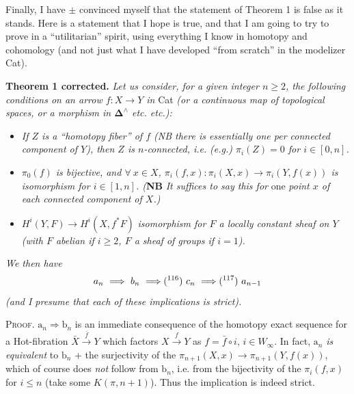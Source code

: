 \documentclass[11pt]{article}
\newcommand{\msp}[1]{\marginpar{\footnotesize [#1]}}
\begin{document}
Finally, I have $\pm$ convinced myself that the statement of Theorem 1 is false as it stands. Here is a statement that I hope is true, and that I am going to try to prove in a ``utilitarian'' spirit, using everything I know in homotopy and cohomology (and not just what I have developed ``from scratch'' in the modelizer Cat). %

\textbf{Theorem 1 corrected.} \textit{Let us consider, for a given integer $n \geq 2$, the following conditions on an arrow $f : X \longrightarrow Y$ in} Cat \textit{(or a continuous map of topological spaces, or a morphism in $\mathbf{\Delta}^\wedge$ etc. etc.):}

\begin{itemize}
\item[$a_n$)] \textit{If $Z$ is a ``homotopy fiber'' of $f$ (NB there is essentially one per connected component of $Y$), then $Z$ is $n$-connected, i.e.}
\msp{page 179}
\textit{(e.g.) $\pi_i(Z) = 0$ for $i \in [0,n]$.}

\item[$b_n$)] \textit{$\pi_0(f)$ is bijective, and $\forall\ x \in X$, $\pi_i(f,x) : \pi_i(X,x) \longrightarrow \pi_i(Y,f(x))$ is} \textit{isomorphism for $i \in [1,n]$. (}\textbf{NB} \textit{It suffices to say this for} \textup{one} \textit{point $x$ of each connected component of $X$.)}

\item[$c_n$)] $H^i(Y,F) \longrightarrow H^i(X,f^*F)$ \textit{isomorphism for $F$ a locally constant sheaf on $Y$ (with $F$ abelian if $i \geq 2$, $F$ a sheaf of groups if $i = 1$).}
\end{itemize}

\textit{We then have}
\[
a_n \ \Longrightarrow\ b_n \ \Longrightarrow \text{(\footnotemark[116])}\ c_n \ \Longrightarrow \text{(\footnotemark[117])}\ a_{n-1}
\]
%
%
\textit{(and I presume that each of these implications is strict).}

\textsc{Proof}. $\mathrm{a}_n \Longrightarrow \mathrm{b}_n$ is an immediate consequence of the homotopy exact sequence for a Hot-fibration $\bar{X} \xrightarrow{\bar{f}} Y$ which factors $X \xrightarrow{f} Y$ as $f = \bar{f} \circ i$, $i \in W_\infty$. In fact, $\mathrm{a}_n$ \textit{is equivalent} to $\mathrm{b}_n$ + the surjectivity of the $\pi_{n+1}(X,x) \longrightarrow \pi_{n+1}(Y,f(x))$, which of course does \textit{not} follow from $\mathrm{b}_n$, i.e. from the bijectivity of the $\pi_i(f,x)$ for $i \leq n$ (take some $K(\pi,n+1)$). Thus the implication is indeed strict.
\end{document}
